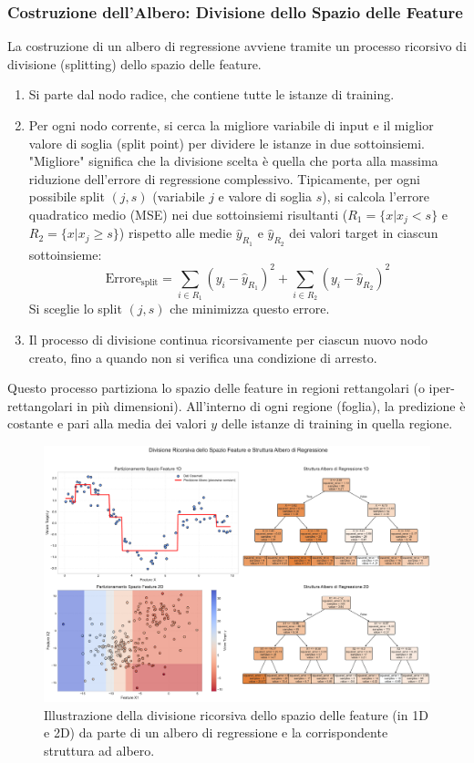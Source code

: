 \documentclass{article}
\begin{document}
\subsubsection{Costruzione dell'Albero: Divisione dello Spazio delle Feature}
La costruzione di un albero di regressione avviene tramite un processo ricorsivo di divisione (splitting) dello spazio delle feature.
\begin{enumerate}
    \item Si parte dal nodo radice, che contiene tutte le istanze di training.
    \item Per ogni nodo corrente, si cerca la migliore variabile di input e il miglior valore di soglia (split point) per dividere le istanze in due sottoinsiemi. "Migliore" significa che la divisione scelta è quella che porta alla massima riduzione dell'errore di regressione complessivo. Tipicamente, per ogni possibile split $(j, s)$ (variabile $j$ e valore di soglia $s$), si calcola l'errore quadratico medio (MSE) nei due sottoinsiemi risultanti ($R_1 = \{x | x_j < s\}$ e $R_2 = \{x | x_j \ge s\}$) rispetto alle medie $\hat{y}_{R_1}$ e $\hat{y}_{R_2}$ dei valori target in ciascun sottoinsieme:
          $$ \text{Errore}_{\text{split}} = \sum_{i \in R_1} (y_i - \hat{y}_{R_1})^2 + \sum_{i \in R_2} (y_i - \hat{y}_{R_2})^2 $$
          Si sceglie lo split $(j,s)$ che minimizza questo errore.
    \item Il processo di divisione continua ricorsivamente per ciascun nuovo nodo creato, fino a quando non si verifica una condizione di arresto.
\end{enumerate}
Questo processo partiziona lo spazio delle feature in regioni rettangolari (o iper-rettangolari in più dimensioni). All'interno di ogni regione (foglia), la predizione è costante e pari alla media dei valori $y$ delle istanze di training in quella regione.

\begin{figure}[H]
    \centering
    \includegraphics[width=1\textwidth]{images/feature_space_partitioning.pdf}
    \caption{Illustrazione della divisione ricorsiva dello spazio delle feature (in 1D e 2D) da parte di un albero di regressione e la corrispondente struttura ad albero.}
    \label{fig:feature_space_partitioning}
\end{figure}
\end{document}
